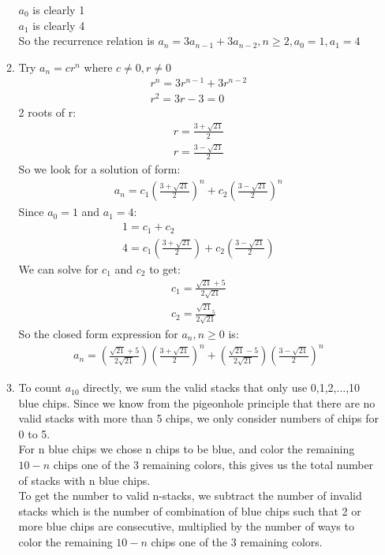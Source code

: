 \documentclass[11pt]{article}
\begin{document}
\begin{enumerate}[]
\begin{enumerate}
	$a_0$ is clearly 1\\
	$a_1$ is clearly 4\\
	So the recurrence relation is $a_n = 3a_{n-1} + 3a_{n-2}, n\geq 2, a_0=1, a_1=4$
	\item Try $a_n=cr^n$ where $c\neq 0, r\neq 0$\\
	\begin{gather}
		r^n=3r^{n-1}+3r^{n-2} \nonumber\\
		r^2=3r-3=0 \nonumber
	\end{gather}
	2 roots of r: 
	\begin{gather}
		r=\frac{3+\sqrt{21}}{2} \nonumber\\
		r=\frac{3-\sqrt{21}}{2} \nonumber
	\end{gather}
	So we look for a solution of form:
	\begin{gather}
		a_n=c_1(\frac{3+\sqrt{21}}{2})^n + c_2(\frac{3-\sqrt{21}}{2})^n\nonumber
	\end{gather}
	Since $a_0=1$ and $a_1=4$:
	\begin{gather}
	1=c_1+ c_2 \nonumber\\
	4=c_1(\frac{3+\sqrt{21}}{2}) + c_2(\frac{3-\sqrt{21}}{2}) \nonumber
	\end{gather}
	We can solve for $c_1$ and $c_2$ to get:
	\begin{gather}
		c_1 = \frac{\sqrt{21}+5}{2\sqrt{21}}\nonumber\\
		c_2 = \frac{\sqrt{21}_5}{2\sqrt{21}} \nonumber
	\end{gather}
	So the closed form expression for $a_n, n\geq 0$ is:
	\begin{gather}
		a_n = (\frac{\sqrt{21}+5}{2\sqrt{21}})(\frac{3+\sqrt{21}}{2})^n+ (\frac{\sqrt{21}-5}{2\sqrt{21}})(\frac{3-\sqrt{21}}{2})^n \nonumber
	\end{gather}
	\item To count $a_10$ directly, we sum the valid stacks that only use 0,1,2,...,10 blue chips. Since we know from the pigeonhole principle that there are no valid stacks with more than 5 chips, we only consider numbers of chips for 0 to 5.\\
	For n blue chips we chose n chips to be blue, and color the remaining $10-n$ chips one of the 3 remaining colors, this gives us the total number of stacks with n blue chips.\\
	To get the number to valid n-stacks, we subtract the number of invalid stacks which is the number of combination of blue chips such that 2 or more blue chips are consecutive, multiplied by the number of ways to color the remaining $10-n$ chips one of the 3 remaining colors.\\

\end{enumerate}
\end{enumerate}
\end{document}
